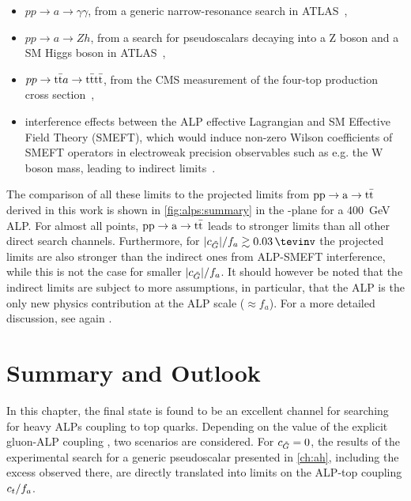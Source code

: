 \begin{itemize}
    \item $p p \rightarrow a \rightarrow \gamma \gamma$, from a generic narrow-resonance search in ATLAS~\cite{ATLAS:2021uiz},

    \item $p p \rightarrow a \rightarrow Z h$, from a search for pseudoscalars decaying into a Z boson and a SM Higgs boson in ATLAS~\cite{ATLAS:2022enb},

    \item $p p \rightarrow \mathrm{t \bar{t}} a \rightarrow \mathrm{t \bar{t}} \mathrm{t \bar{t}}$, from the CMS measurement of the four-top production cross section~\cite{CMS:2023ftu},

    \item interference effects between the ALP effective Lagrangian and SM Effective Field Theory (SMEFT), which would induce non-zero Wilson coefficients of SMEFT operators in electroweak precision observables such as e.g. the W boson mass, leading to indirect limits~\cite{Biekotter:2023mpd}.
\end{itemize}

The comparison of all these limits to the projected limits from $\mathrm{pp \rightarrow a \rightarrow \mathrm{t \bar{t}}}$ derived in this work is shown in \cref{fig:alps:summary} in the \ct-\cG plane for a \SI{400}{\GeV} ALP. For almost all points, $\mathrm{pp \rightarrow a \rightarrow \mathrm{t \bar{t}}}$ leads to stronger limits than all other direct search channels. Furthermore, for $|\cG|/f_a \gtrsim \SI{0.03}{\tevinv}$ the projected limits are also stronger than the indirect ones from ALP-SMEFT interference, while this is not the case for smaller $|c_{\tilde{G}}|/f_a$. It should however be noted that the indirect limits are subject to more assumptions, in particular, that the ALP is the only new physics contribution at the ALP scale ($\approx f_a$). For a more detailed discussion, see again .

\section{Summary and Outlook}
\label{sec:alps:summary}

In this chapter, the \ttbar final state is found to be an excellent channel for searching for heavy ALPs coupling to top quarks. Depending on the value of the explicit gluon-ALP coupling \cG, two scenarios are considered. For $c_{\tilde{G}} = 0$, the results of the experimental search for a generic pseudoscalar presented in \cref{ch:ah}, including the excess observed there,  are directly translated into limits on the ALP-top coupling $c_t/f_a$. 

